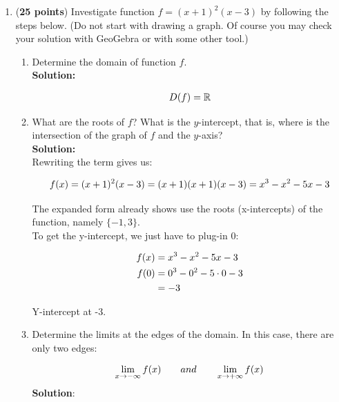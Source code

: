 \documentclass[a4paper]{article}
\begin{document}
\begin{enumerate}
\begin{enumerate}
	
	
	
\end{enumerate}


\item (\textbf{25 points}) Investigate function $f = (x+1)^2(x-3)$ by following the steps below. (Do not start with drawing a graph. Of course you may check your solution with GeoGebra or with some other tool.)

\begin{enumerate}
	\item Determine the domain of function $f$.\\
	\textbf{Solution:}
		
\begin{align}
	D(f) = \mathbb{R}\notag
\end{align}		
\vspace{1em}		
		
	\item What are the roots of $f$? What is the $y$-intercept, that is, where is the intersection of the graph of $f$ and the $y$-axis?\\
	\textbf{Solution:}\\
	
Rewriting the term gives us:	
	
\begin{align}
	f(x) = (x+1)^2(x-3) = (x+1)(x+1)(x-3) = x^3 - x^2 - 5x - 3\notag
\end{align}	
	
The expanded form already shows use the roots (x-intercepts) of the function, namely $\{-1,3 \}$.\\
	
To get the y-intercept, we just have to plug-in 0:

\begin{align}
	f(x) &= x^3 - x^2 - 5x - 3\notag\\
	f(0) &= 0^3 - 0^2 - 5 \cdot 0 - 3\notag\\
		&= -3\notag
\end{align}	
	
Y-intercept at -3.\\
	
	
	\item Determine the limits at the edges of the domain. In this case, there are only two edges:
	
	\begin{align}
	\lim_{x \to -\infty }f(x) \qquad and \qquad \lim_{x \to +\infty}f(x)\notag	
	\end{align}	
	\textbf{Solution}:\\
	

\end{enumerate}
\end{enumerate}
\end{document}
